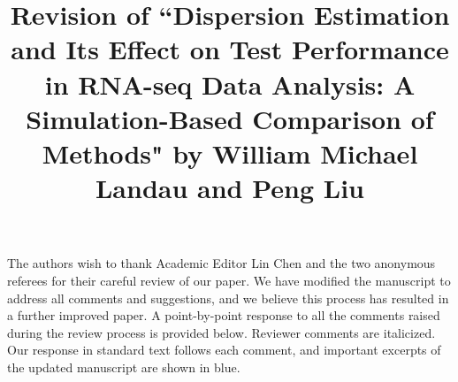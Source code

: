 \documentclass{article}
\date{}
\title{\vspace{2cm} Revision of ``Dispersion Estimation and Its Effect on Test Performance in RNA-seq Data Analysis: A Simulation-Based Comparison of Methods" by William Michael Landau and Peng Liu}
\begin{document}
\maketitle

\paragraph{} \indent The authors wish to thank Academic Editor Lin Chen and the two anonymous referees for their careful review of our paper. We have modified the manuscript to address all comments and suggestions, and we believe this process has resulted in a further improved paper. A point-by-point response to all the comments raised during the review process is provided below. Reviewer comments are italicized. Our response in standard text follows each comment, and important excerpts of the updated manuscript are shown in blue. 
\end{document}
